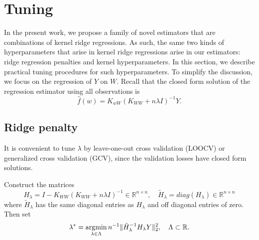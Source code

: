 \section{Tuning}\label{sec:tuning}

In the present work, we propose a family of novel estimators that are combinations of kernel ridge regressions. As such, the same two kinds of hyperparameters that arise in kernel ridge regressions arise in our estimators: ridge regression penalties and kernel hyperparameters. In this section, we describe practical tuning procedures for such hyperparameters. To simplify the discussion, we focus on the regression of $Y$ on $W$. Recall that the closed form solution of the regression estimator using all observations is
$$
\hat{f}(w)=K_{wW}(K_{WW}+n\lambda  I )^{-1}Y.
$$

\subsection{Ridge penalty}

It is convenient to tune $\lambda$ by leave-one-out cross validation (LOOCV) or generalized cross validation (GCV), since the validation losses have closed form solutions.

\begin{algorithm}
Construct the matrices
$$
H_{\lambda}= I -K_{WW}(K_{WW}+n\lambda  I )^{-1}\in\mathbb{R}^{n\times n},\quad \tilde{H}_{\lambda}=diag(H_{\lambda})\in\mathbb{R}^{n\times n}
$$
where $\tilde{H}_{\lambda}$ has the same diagonal entries as $H_{\lambda}$ and off diagonal entries of zero. Then set
$$
\lambda^*=\operatorname*{\arg\!\min}_{\lambda \in\Lambda} n^{-1}\|\tilde{H}_{\lambda}^{-1}H_{\lambda} Y\|_2^2,\quad \Lambda\subset\mathbb{R}.
$$
\end{algorithm}

